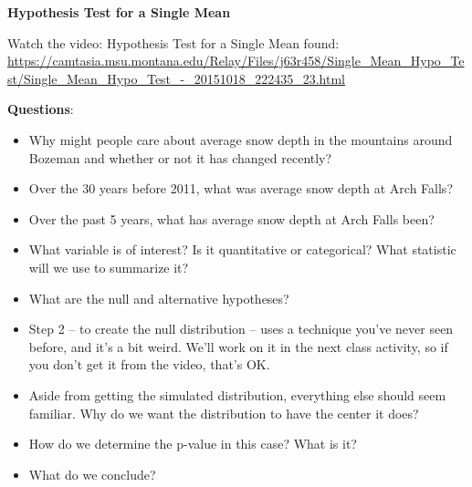 \def\theTopic{Reading 13}

\begin{center}
  {\bf Hypothesis Test for a Single Mean}
\end{center}

Watch the video: Hypothesis Test for a Single Mean found:\\
\url{https://camtasia.msu.montana.edu/Relay/Files/j63r458/Single_Mean_Hypo_Test/Single_Mean_Hypo_Test_-_20151018_222435_23.html}

{\bf Questions}:
\begin{itemize}
  \item Why might people care about average snow depth in the
    mountains around Bozeman and whether or not it has changed
    recently?\vfill
  \item Over the 30 years before 2011, what was average snow depth at
    Arch Falls?\vfill %
  \item Over the past 5 years, what has average snow depth at Arch
    Falls been? \vfill%
  \item What variable is of interest? Is it quantitative or
    categorical? What statistic will we use to summarize it?\vfill
  \item What are the null and alternative hypotheses?\vfill
  \item Step 2 -- to create the null distribution -- uses a technique
    you've never seen before, and it's a bit weird. We'll work on it
    in the next class activity, so if you don't get it from the video,
    that's OK.\vfill
  \item Aside from getting the simulated distribution, everything else
    should seem familiar. Why do we want the distribution to have the
    center it does?\vfill
  \item How do we determine the p-value in this case? What is it?\vfill
  \item What do we conclude?\vspace*{\fill}
\end{itemize}


